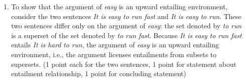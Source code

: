 \documentclass[a4,11pt]{article}
\begin{document}
\begin{enumerate}[leftmargin = 12pt]
\begin{enumerate}[noitemsep]
\item To show that the argument of \textit{easy} is an upward entailing environment, consider the two sentences {\em It is easy to run fast} and {\em It is easy to run}. These two sentences differ only on the argument of {\em easy}: the set denoted by {\em to run} is a superset of the set denoted by {\em to run fast}. Because {\em It is easy to run fast} entails {\em It is hard to run}, the argument of {\em easy} is an upward entailing environment, i.e., the argument licenses entailments from subsets to supersets. (1 point each for the two sentences, 1 point for statement about entailment relationship, 1 point for concluding statement)

\end{enumerate}


\end{enumerate}
\end{document}

